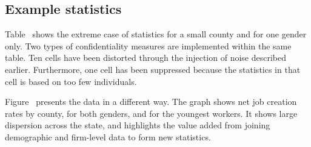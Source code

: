 \subsection{Example statistics}
\label{sec:example_statistics}

Table~ shows the extreme case of statistics for a
small county and for one gender only.%
%
%
Two types of confidentiality measures are
implemented within the same table. Ten cells have been distorted through
the injection of noise described earlier. Furthermore, one cell has been
suppressed because the statistics in that cell is based on too few
individuals.


  
  
  Figure~ presents the data in a different way.
  The graph shows net job creation rates by county, for both genders, and
  for the youngest workers. It shows large dispersion across the state, and
  highlights the value added from joining demographic and firm-level data
  to form new statistics.

  
  

